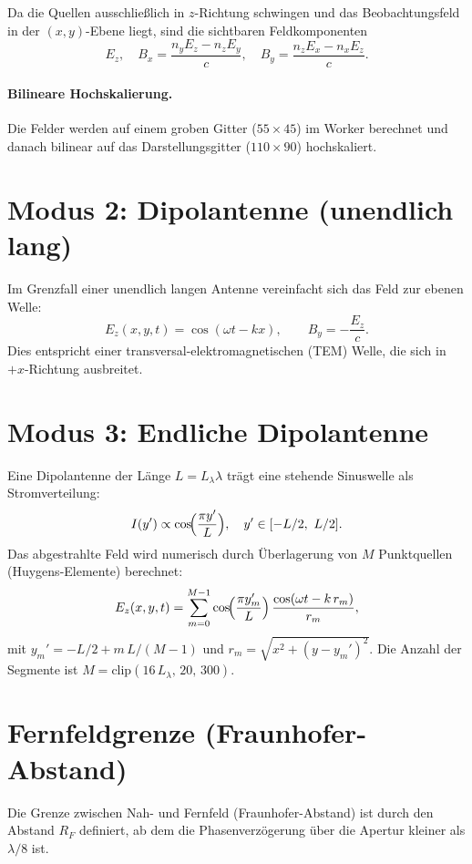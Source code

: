\documentclass[11pt,a4paper]{article}
\begin{document}
Da die Quellen ausschließlich in $z$-Richtung schwingen und das
Beobachtungsfeld in der $(x,y)$-Ebene liegt, sind die sichtbaren
Feldkomponenten
\[
  E_z,\quad B_x = \frac{n_y E_z - n_z E_y}{c}, \quad
  B_y = \frac{n_z E_x - n_x E_z}{c}.
\]

\paragraph{Bilineare Hochskalierung.}
Die Felder werden auf einem groben Gitter ($55 \times 45$) im Worker
berechnet und danach bilinear auf das Darstellungsgitter ($110 \times 90$)
hochskaliert.

\section{Modus 2: Dipolantenne (unendlich lang)}

Im Grenzfall einer unendlich langen Antenne vereinfacht sich das Feld zur
ebenen Welle:
\[
  E_z(x, y, t) = \cos(\omega t - k x), \qquad B_y = -\frac{E_z}{c}.
\]
Dies entspricht einer transversal-elektromagnetischen (TEM) Welle, die sich
in $+x$-Richtung ausbreitet.

\section{Modus 3: Endliche Dipolantenne}

Eine Dipolantenne der Länge $L = L_\lambda \lambda$ trägt eine stehende
Sinuswelle als Stromverteilung:
\[
  I(y') \propto \cos\!\Bigl(\frac{\pi y'}{L}\Bigr), \quad y' \in [-L/2,\ L/2].
\]
Das abgestrahlte Feld wird numerisch durch Überlagerung von $M$ Punktquellen
(Huygens-Elemente) berechnet:
\[
  E_z(x, y, t) = \sum_{m=0}^{M-1}
    \cos\!\Bigl(\frac{\pi y_m'}{L}\Bigr)\,
    \frac{\cos(\omega t - k\,r_m)}{r_m},
\]
mit $y_m' = -L/2 + m\,L/(M-1)$ und $r_m = \sqrt{x^2 + (y - y_m')^2}$.
Die Anzahl der Segmente ist $M = \text{clip}(16\,L_\lambda,\,20,\,300)$.

\section{Fernfeldgrenze (Fraunhofer-Abstand)}

Die Grenze zwischen Nah- und Fernfeld (Fraunhofer-Abstand) ist durch den
Abstand $R_F$ definiert, ab dem die Phasenverzögerung über die Apertur
kleiner als $\lambda/8$ ist.
\end{document}
